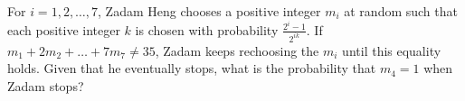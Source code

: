 For $i=1,2,\ldots,7$, Zadam Heng chooses a positive integer $m_i$ at random such that each positive integer $k$ is chosen with probability $\frac{2^i-1}{2^{ik}}$. If $m_1+2m_2+\ldots+7m_7\neq35$, Zadam keeps rechoosing the $m_i$ until this equality holds. Given that he eventually stops, what is the probability that $m_4=1$ when Zadam stops?